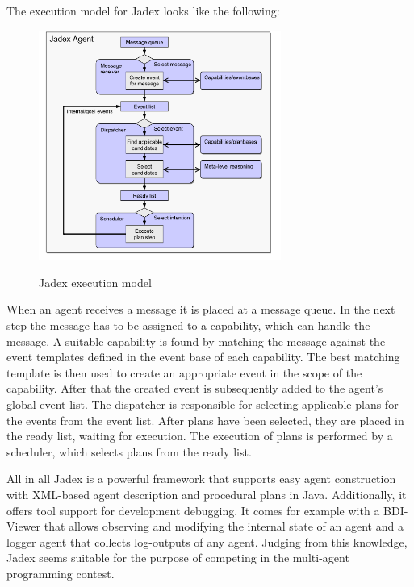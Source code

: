 The execution model for Jadex looks like the following:
\begin{figure}
	\centering
	\includegraphics[width=300px]{images/Jadex_execution_model.png}
	\label{fig4}
	\caption{Jadex execution model \cite{pokahr_jadex_2005}}
\end{figure}
\newline
When an agent receives a message it is placed at a message queue.
In the next step the message has to be assigned to a capability, which can handle the message.
A suitable capability is found by matching the message against the event templates defined in the event base of each capability.
The best matching template is then used to create an appropriate event in the scope of the capability.
After that the created event is subsequently added to the agent's global event list.
The dispatcher is responsible for selecting applicable plans for the events from the event list.
After plans have been selected, they are placed in the ready list, waiting for execution.
The execution of plans is performed by a scheduler, which selects plans from the ready list.

All in all Jadex is a powerful framework that supports easy agent construction with XML-based agent description and procedural plans in Java.
Additionally, it offers tool support for development debugging.
It comes for example with a BDI-Viewer that allows observing and modifying the internal state of an agent and a logger agent that collects log-outputs of any agent.
Judging from this knowledge, Jadex seems suitable for the purpose of competing in the multi-agent programming contest.
